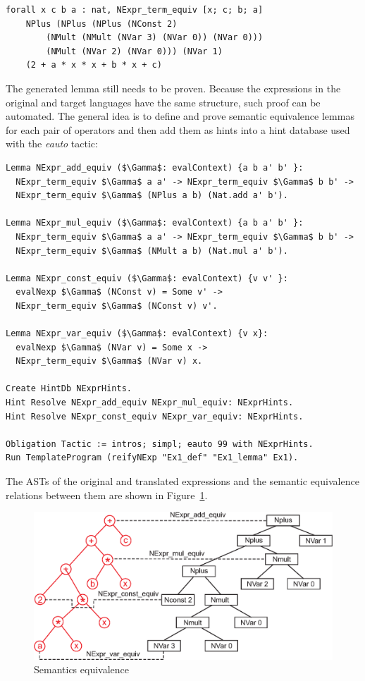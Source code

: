 \documentclass[sigplan]{acmart}\settopmatter{printfolios=true,printccs=false,printacmref=false}
\begin{document}
\begin{lstlisting}[language=Coq, mathescape=true,
  basicstyle=\footnotesize]
forall x c b a : nat, NExpr_term_equiv [x; c; b; a]
    NPlus (NPlus (NPlus (NConst 2)
        (NMult (NMult (NVar 3) (NVar 0)) (NVar 0)))
        (NMult (NVar 2) (NVar 0))) (NVar 1)
    (2 + a * x * x + b * x + c)
\end{lstlisting}

The generated lemma still needs to be proven. Because the expressions
in the original and target languages have the same structure, such proof
can be automated. The general idea is to define and prove semantic
equivalence lemmas for each pair of operators and then add them as
hints into a hint database used with the \emph{eauto} tactic:

\begin{lstlisting}[language=Coq, mathescape=true,
  basicstyle=\footnotesize]
Lemma NExpr_add_equiv ($\Gamma$: evalContext) {a b a' b' }:
  NExpr_term_equiv $\Gamma$ a a' -> NExpr_term_equiv $\Gamma$ b b' ->
  NExpr_term_equiv $\Gamma$ (NPlus a b) (Nat.add a' b').

Lemma NExpr_mul_equiv ($\Gamma$: evalContext) {a b a' b' }:
  NExpr_term_equiv $\Gamma$ a a' -> NExpr_term_equiv $\Gamma$ b b' ->
  NExpr_term_equiv $\Gamma$ (NMult a b) (Nat.mul a' b').

Lemma NExpr_const_equiv ($\Gamma$: evalContext) {v v' }:
  evalNexp $\Gamma$ (NConst v) = Some v' ->
  NExpr_term_equiv $\Gamma$ (NConst v) v'.

Lemma NExpr_var_equiv ($\Gamma$: evalContext) {v x}:
  evalNexp $\Gamma$ (NVar v) = Some x ->
  NExpr_term_equiv $\Gamma$ (NVar v) x.

Create HintDb NExprHints.
Hint Resolve NExpr_add_equiv NExpr_mul_equiv: NExprHints.
Hint Resolve NExpr_const_equiv NExpr_var_equiv: NExprHints.

Obligation Tactic := intros; simpl; eauto 99 with NExprHints.
Run TemplateProgram (reifyNExp "Ex1_def" "Ex1_lemma" Ex1).
\end{lstlisting}

The ASTs of the original and translated expressions and the semantic
equivalence relations between them are shown in Figure~\ref{fig:trees}.

\begin{figure}[h]
  \includegraphics[width=\columnwidth]{trees.eps}
  \caption{Semantics equivalence}
  \label{fig:trees}
\end{figure}
\end{document}
